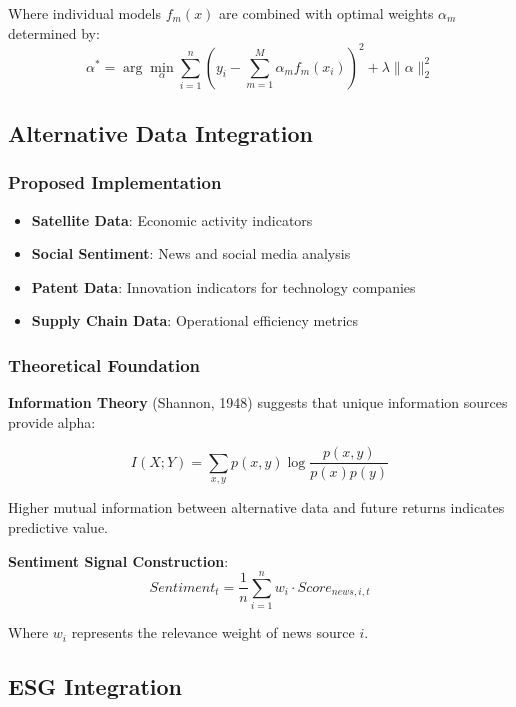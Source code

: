 \documentclass[12pt,a4paper]{article}
\begin{document}
Where individual models $f_m(x)$ are combined with optimal weights $\alpha_m$ determined by:
\begin{equation}
\alpha^* = \arg\min_\alpha \sum_{i=1}^n \left(y_i - \sum_{m=1}^M \alpha_m f_m(x_i)\right)^2 + \lambda \|\alpha\|_2^2
\end{equation}

\subsection{Alternative Data Integration}

\subsubsection{Proposed Implementation}
\begin{itemize}
    \item \textbf{Satellite Data}: Economic activity indicators
    \item \textbf{Social Sentiment}: News and social media analysis
    \item \textbf{Patent Data}: Innovation indicators for technology companies
    \item \textbf{Supply Chain Data}: Operational efficiency metrics
\end{itemize}

\subsubsection{Theoretical Foundation}
\textbf{Information Theory} (Shannon, 1948) suggests that unique information sources provide alpha:

\begin{equation}
I(X;Y) = \sum_{x,y} p(x,y) \log\frac{p(x,y)}{p(x)p(y)}
\end{equation}

Higher mutual information between alternative data and future returns indicates predictive value.

\textbf{Sentiment Signal Construction}:
\begin{equation}
Sentiment_t = \frac{1}{n} \sum_{i=1}^n w_i \cdot Score_{news,i,t}
\end{equation}

Where $w_i$ represents the relevance weight of news source $i$.

\subsection{ESG Integration}
\end{document}
